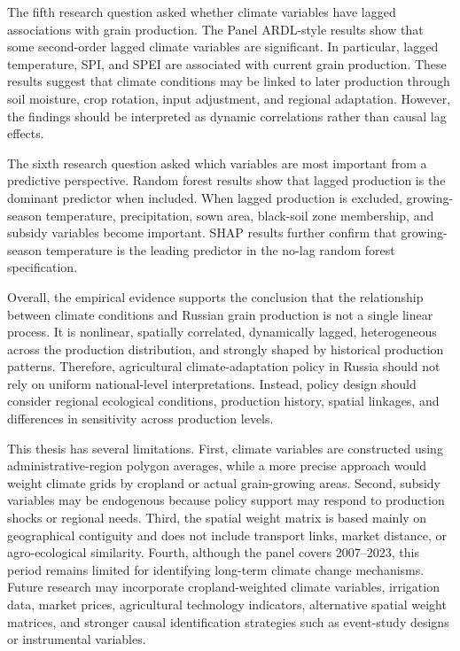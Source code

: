 \documentclass[12pt,a4paper]{article}
\begin{document}
The fifth research question asked whether climate variables have lagged associations with grain production. The Panel ARDL-style results show that some second-order lagged climate variables are significant. In particular, lagged temperature, SPI, and SPEI are associated with current grain production. These results suggest that climate conditions may be linked to later production through soil moisture, crop rotation, input adjustment, and regional adaptation. However, the findings should be interpreted as dynamic correlations rather than causal lag effects.

The sixth research question asked which variables are most important from a predictive perspective. Random forest results show that lagged production is the dominant predictor when included. When lagged production is excluded, growing-season temperature, precipitation, sown area, black-soil zone membership, and subsidy variables become important. SHAP results further confirm that growing-season temperature is the leading predictor in the no-lag random forest specification.

Overall, the empirical evidence supports the conclusion that the relationship between climate conditions and Russian grain production is not a single linear process. It is nonlinear, spatially correlated, dynamically lagged, heterogeneous across the production distribution, and strongly shaped by historical production patterns. Therefore, agricultural climate-adaptation policy in Russia should not rely on uniform national-level interpretations. Instead, policy design should consider regional ecological conditions, production history, spatial linkages, and differences in sensitivity across production levels.

This thesis has several limitations. First, climate variables are constructed using administrative-region polygon averages, while a more precise approach would weight climate grids by cropland or actual grain-growing areas. Second, subsidy variables may be endogenous because policy support may respond to production shocks or regional needs. Third, the spatial weight matrix is based mainly on geographical contiguity and does not include transport links, market distance, or agro-ecological similarity. Fourth, although the panel covers 2007--2023, this period remains limited for identifying long-term climate change mechanisms. Future research may incorporate cropland-weighted climate variables, irrigation data, market prices, agricultural technology indicators, alternative spatial weight matrices, and stronger causal identification strategies such as event-study designs or instrumental variables.
\end{document}
